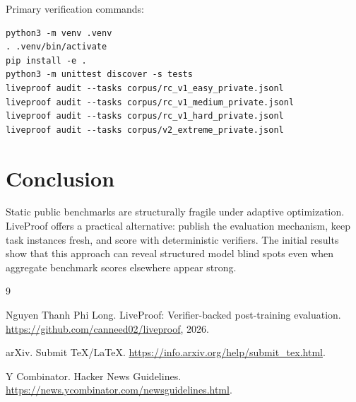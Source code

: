 \documentclass[11pt]{article}
\begin{document}
Primary verification commands:
\begin{verbatim}
python3 -m venv .venv
. .venv/bin/activate
pip install -e .
python3 -m unittest discover -s tests
liveproof audit --tasks corpus/rc_v1_easy_private.jsonl
liveproof audit --tasks corpus/rc_v1_medium_private.jsonl
liveproof audit --tasks corpus/rc_v1_hard_private.jsonl
liveproof audit --tasks corpus/v2_extreme_private.jsonl
\end{verbatim}

\section{Conclusion}

Static public benchmarks are structurally fragile under adaptive optimization.
LiveProof offers a practical alternative: publish the evaluation mechanism, keep
task instances fresh, and score with deterministic verifiers. The initial
results show that this approach can reveal structured model blind spots even
when aggregate benchmark scores elsewhere appear strong.

\begin{thebibliography}{9}

Nguyen Thanh Phi Long.
\newblock LiveProof: Verifier-backed post-training evaluation.
\newblock \url{https://github.com/canneed02/liveproof}, 2026.

arXiv.
\newblock Submit TeX/LaTeX.
\newblock \url{https://info.arxiv.org/help/submit_tex.html}.

Y Combinator.
\newblock Hacker News Guidelines.
\newblock \url{https://news.ycombinator.com/newsguidelines.html}.

\end{thebibliography}
\end{document}
